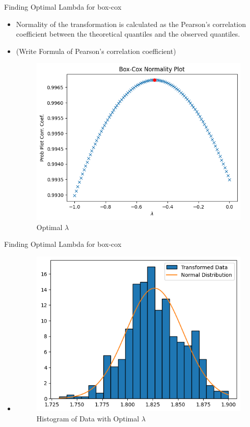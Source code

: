 \begin{frame}{Finding Optimal Lambda for box-cox}
\begin{itemize}
    \item Normality of the transformation is calculated as the Pearson's correlation coefficient between the theoretical quantiles and the observed quantiles.
    \item (Write Formula of Pearson's correlation coefficient)
    \vspace{0.25in}
    \begin{figure}
        \centering
        \includegraphics[width=0.5\linewidth]{Project1/Report/images/normality.png}
        \caption{Optimal $\lambda$}
        \label{fig:enter-label}
    \end{figure}
\end{itemize}
  
\end{frame}

\begin{frame}{Finding Optimal Lambda for box-cox}
\begin{itemize}
    \item \begin{figure}
        \centering
        \includegraphics[width=0.5\linewidth]{Project1/Report/images/optimal-hist.png}
        \caption{Histogram of Data with Optimal $\lambda$}
        \label{fig:enter-label}
    \end{figure}
\end{itemize}
  
\end{frame}


